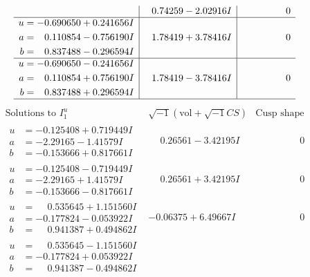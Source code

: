 \documentclass[1p]{elsarticle_modified}
\theoremstyle{definition}
\newcommand{\I}{\sqrt{-1}}
\begin{document}
$$\begin{array}{c|c|c}
 & \phantom{-}0.74259 - 2.02916 I & \phantom{-0.000000 } 0 \\ \hline\begin{aligned}
u &= -0.690650 + 0.241656 I \\
a &= \phantom{-}0.110854 - 0.756190 I \\
b &= \phantom{-}0.837488 - 0.296594 I\end{aligned}
 & \phantom{-}1.78419 + 3.78416 I & \phantom{-0.000000 } 0 \\ \hline\begin{aligned}
u &= -0.690650 - 0.241656 I \\
a &= \phantom{-}0.110854 + 0.756190 I \\
b &= \phantom{-}0.837488 + 0.296594 I\end{aligned}
 & \phantom{-}1.78419 - 3.78416 I & \phantom{-0.000000 } 0\\
 \hline 
 \end{array}$$\newpage$$\begin{array}{c|c|c}  
\text{Solutions to }I^u_{1}& \I (\text{vol} + \sqrt{-1}CS) & \text{Cusp shape}\\
 \hline 
\begin{aligned}
u &= -0.125408 + 0.719449 I \\
a &= -2.29165 - 1.41579 I \\
b &= -0.153666 + 0.817661 I\end{aligned}
 & \phantom{-}0.26561 - 3.42195 I & \phantom{-0.000000 } 0 \\ \hline\begin{aligned}
u &= -0.125408 - 0.719449 I \\
a &= -2.29165 + 1.41579 I \\
b &= -0.153666 - 0.817661 I\end{aligned}
 & \phantom{-}0.26561 + 3.42195 I & \phantom{-0.000000 } 0 \\ \hline\begin{aligned}
u &= \phantom{-}0.535645 + 1.151560 I \\
a &= -0.177824 - 0.053922 I \\
b &= \phantom{-}0.941387 + 0.494862 I\end{aligned}
 & -0.06375 + 6.49667 I & \phantom{-0.000000 } 0 \\ \hline\begin{aligned}
u &= \phantom{-}0.535645 - 1.151560 I \\
a &= -0.177824 + 0.053922 I \\
b &= \phantom{-}0.941387 - 0.494862 I\end{aligned}

\end{array}$$
\end{document}
